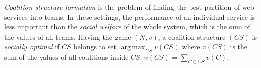 
            \emph{Coalition structure formation} is the problem of finding the best
            partition of web services into teams. In these settings, the
            performance of an individual service is less important than the
            \emph{social welfare} of the whole system, which is the sum of the
            values of all teams. Having the game $(N,v)$, a coalition
            structure $(CS)$ is \emph{socially optimal} if $CS$ belongs to set
            $\operatorname*{arg\,max}_{CS} v(CS)$ where $v(CS)$ is the sum of
            the values of all coalitions inside $CS$. $v(CS) = \sum_{C \in
            CS}v(C)$.


%
%

